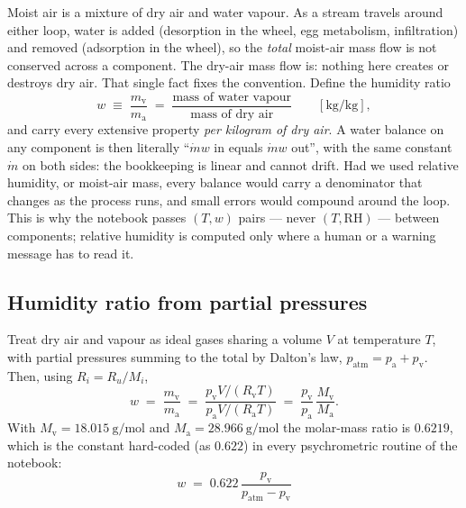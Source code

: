 \documentclass[11pt]{article}
\newcommand{\md}{\ensuremath{\dot m}}
\newcommand{\patm}{\ensuremath{p_{\mathrm{atm}}}}
\newcommand{\RH}{\ensuremath{\mathrm{RH}}}
\begin{document}
Moist air is a mixture of dry air and water vapour. As a stream travels around either loop, water is
added (desorption in the wheel, egg metabolism, infiltration) and removed (adsorption in the wheel),
so the \emph{total} moist-air mass flow is not conserved across a component. The dry-air mass flow
is: nothing here creates or destroys dry air. That single fact fixes the convention. Define the
humidity ratio
\begin{equation}
w \;\equiv\; \frac{m_{\mathrm{v}}}{m_{\mathrm{a}}}
\;=\; \frac{\text{mass of water vapour}}{\text{mass of dry air}}
\qquad [\si{\kilogram\per\kilogram}] , \label{eq:psy:wdef}
\end{equation}
and carry every extensive property \emph{per kilogram of dry air}. A water balance on any component
is then literally ``$\md w$ in equals $\md w$ out'', with the same constant $\md$ on both sides: the
bookkeeping is linear and cannot drift. Had we used relative humidity, or moist-air mass, every
balance would carry a denominator that changes as the process runs, and small errors would compound
around the loop. This is why the notebook passes $(T,w)$ pairs --- never $(T,\RH)$ --- between
components; relative humidity is computed only where a human or a warning message has to read it.

\subsection{Humidity ratio from partial pressures}
\label{sec:psy:partial}

Treat dry air and vapour as ideal gases sharing a volume $V$ at temperature $T$, with partial
pressures summing to the total by Dalton's law, $\patm = p_{\mathrm{a}} + p_{\mathrm{v}}$. Then,
using $R_i = R_u/M_i$,
\begin{equation}
w \;=\; \frac{m_{\mathrm{v}}}{m_{\mathrm{a}}}
\;=\; \frac{p_{\mathrm{v}} V/(R_{\mathrm{v}} T)}{p_{\mathrm{a}} V/(R_{\mathrm{a}} T)}
\;=\; \frac{p_{\mathrm{v}}}{p_{\mathrm{a}}}\,\frac{M_{\mathrm{v}}}{M_{\mathrm{a}}} .
\label{eq:psy:w_ideal}
\end{equation}
With $M_{\mathrm{v}} = \SI{18.015}{\gram\per\mole}$ and $M_{\mathrm{a}} =
\SI{28.966}{\gram\per\mole}$ the molar-mass ratio is $0.6219$, which is the constant hard-coded (as
$0.622$) in every psychrometric routine of the notebook:
\begin{equation}
\boxed{\;w \;=\; 0.622\,\frac{p_{\mathrm{v}}}{\patm - p_{\mathrm{v}}}\;} \label{eq:psy:w_from_pv}
\end{equation}
\end{document}
